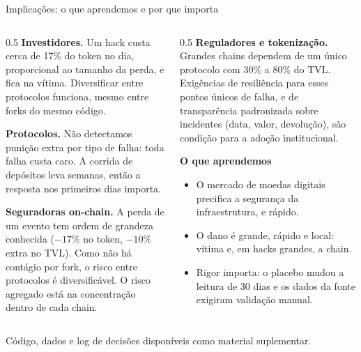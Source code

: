 \documentclass[aspectratio=169,10pt]{beamer}
\newcommand{\fonte}[1]{\par\vfill{\tiny\color{cinza}#1}}
\begin{document}
\begin{frame}{Implicações: o que aprendemos e por que importa}
\small
\begin{columns}[T]
\begin{column}{0.5\textwidth}
\textbf{Investidores.} Um hack custa cerca de 17\% do token no dia, proporcional ao tamanho da perda, e fica na vítima. Diversificar entre protocolos funciona, mesmo entre forks do mesmo código.

\medskip
\textbf{Protocolos.} Não detectamos punição extra por tipo de falha: toda falha custa caro. A corrida de depósitos leva semanas, então a resposta nos primeiros dias importa.

\medskip
\textbf{Seguradoras on-chain.} A perda de um evento tem ordem de grandeza conhecida ($-17$\% no token, $-10$\% extra no TVL). Como não há contágio por fork, o risco entre protocolos é diversificável. O risco agregado está na concentração dentro de cada chain.
\end{column}
\begin{column}{0.5\textwidth}
\textbf{Reguladores e tokenização.} Grandes chains dependem de um único protocolo com 30\% a 80\% do TVL. Exigências de resiliência para esses pontos únicos de falha, e de transparência padronizada sobre incidentes (data, valor, devolução), são condição para a adoção institucional.

\medskip
\textbf{O que aprendemos}
\begin{itemize}\small
\item O mercado de moedas digitais precifica a segurança da infraestrutura, e rápido.
\item O dano é \alert{grande, rápido e local}: vítima e, em hacks grandes, a chain.
\item Rigor importa: o placebo mudou a leitura de 30 dias e os dados da fonte exigiram validação manual.
\end{itemize}
\end{column}
\end{columns}
\fonte{Código, dados e log de decisões disponíveis como material suplementar.}
\end{frame}
\end{document}
